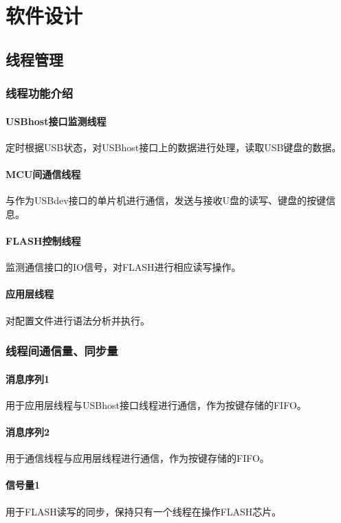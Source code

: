 
\chapter{软件设计}

\section{线程管理}

\subsection{线程功能介绍}

\subsubsection{USBhost接口监测线程}
定时根据USB状态，对USBhost接口上的数据进行处理，读取USB键盘的数据。

\subsubsection{MCU间通信线程}
与作为USBdev接口的单片机进行通信，发送与接收U盘的读写、键盘的按键信息。

\subsubsection{FLASH控制线程}
监测通信接口的IO信号，对FLASH进行相应读写操作。

\subsubsection{应用层线程}
对配置文件进行语法分析并执行。

\subsection{线程间通信量、同步量}
\subsubsection{消息序列1}
用于应用层线程与USBhost接口线程进行通信，作为按键存储的FIFO。
\subsubsection{消息序列2}
用于通信线程与应用层线程进行通信，作为按键存储的FIFO。
\subsubsection{信号量1}
用于FLASH读写的同步，保持只有一个线程在操作FLASH芯片。
